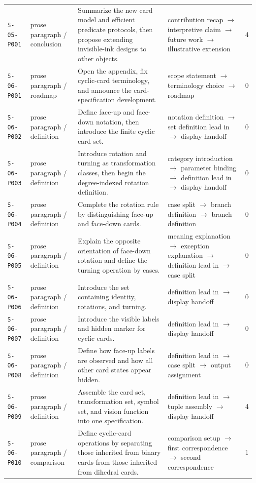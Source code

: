 \documentclass[10pt]{article}
\begin{document}
\begin{longtable}{@{}p{}p{}p{}p{}p{}@{}}
\texttt{S-05-P001}&prose paragraph / conclusion&Summarize the new card model and efficient predicate protocols, then propose extending invisible-ink designs to other objects.&contribution recap $\rightarrow$ interpretive claim $\rightarrow$ future work $\rightarrow$ illustrative extension&4\\
\texttt{S-06-P001}&prose paragraph / roadmap&Open the appendix, fix cyclic-card terminology, and announce the card-specification development.&scope statement $\rightarrow$ terminology choice $\rightarrow$ roadmap&0\\
\texttt{S-06-P002}&prose paragraph / definition&Define face-up and face-down notation, then introduce the finite cyclic card set.&notation definition $\rightarrow$ set definition lead in $\rightarrow$ display handoff&0\\
\texttt{S-06-P003}&prose paragraph / definition&Introduce rotation and turning as transformation classes, then begin the degree-indexed rotation definition.&category introduction $\rightarrow$ parameter binding $\rightarrow$ definition lead in $\rightarrow$ display handoff&0\\
\texttt{S-06-P004}&prose paragraph / definition&Complete the rotation rule by distinguishing face-up and face-down cards.&case split $\rightarrow$ branch definition $\rightarrow$ branch definition&0\\
\texttt{S-06-P005}&prose paragraph / definition&Explain the opposite orientation of face-down rotation and define the turning operation by cases.&meaning explanation $\rightarrow$ exception explanation $\rightarrow$ definition lead in $\rightarrow$ case split&0\\
\texttt{S-06-P006}&prose paragraph / definition&Introduce the set containing identity, rotations, and turning.&definition lead in $\rightarrow$ display handoff&0\\
\texttt{S-06-P007}&prose paragraph / definition&Introduce the visible labels and hidden marker for cyclic cards.&definition lead in $\rightarrow$ display handoff&0\\
\texttt{S-06-P008}&prose paragraph / definition&Define how face-up labels are observed and how all other card states appear hidden.&definition lead in $\rightarrow$ case split $\rightarrow$ output assignment&0\\
\texttt{S-06-P009}&prose paragraph / definition&Assemble the card set, transformation set, symbol set, and vision function into one specification.&definition lead in $\rightarrow$ tuple assembly $\rightarrow$ display handoff&4\\
\texttt{S-06-P010}&prose paragraph / comparison&Define cyclic-card operations by separating those inherited from binary cards from those inherited from dihedral cards.&comparison setup $\rightarrow$ first correspondence $\rightarrow$ second correspondence&1\\
\bottomrule\end{longtable}\normalsize\clearpage
\end{document}
